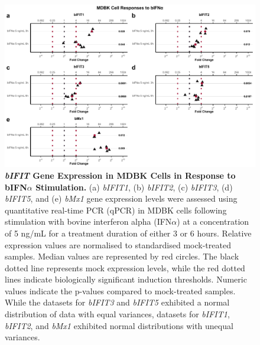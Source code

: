 \begin{figure}
    \centering
    \includegraphics[width=1\linewidth]{07. Chapter 2/Figs/02. Induction/01. mdbk_treat_bifna.pdf}
    \caption[\textit{bIFIT} Gene Expression in MDBK Cells in Response to bIFN\(\alpha\) Stimulation.]{\textbf{\textit{bIFIT} Gene Expression in MDBK Cells in Response to bIFN\(\alpha\) Stimulation.} (a) \textit{bIFIT1}, (b) \textit{bIFIT2}, (c) \textit{bIFIT3}, (d) \textit{bIFIT5}, and (e) \textit{bMx1} gene expression levels were assessed using quantitative real-time PCR (qPCR) in MDBK cells following stimulation with bovine interferon alpha (IFN\(\alpha\)) at a concentration of 5 ng/mL for a treatment duration of either 3 or 6 hours. Relative expression values are normalised to standardised mock-treated samples. Median values are represented by red circles. The black dotted line represents mock expression levels, while the red dotted lines indicate biologically significant induction thresholds. Numeric values indicate the p-values compared to mock-treated samples. While the datasets for \textit{bIFIT3} and \textit{bIFIT5} exhibited a normal distribution of data with equal variances, datasets for \textit{bIFIT1}, \textit{bIFIT2}, and \textit{bMx1} exhibited normal distributions with unequal variances.}
    \label{fig:MDBK responses to bIFNa}
\end{figure}

